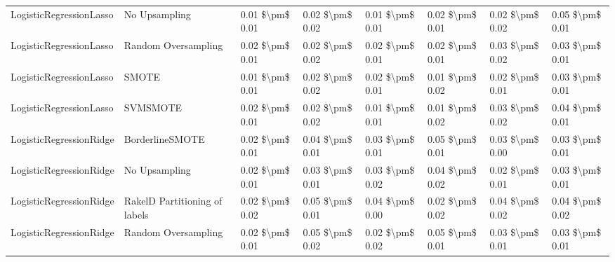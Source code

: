 \begin{tabular}{llllllll}
        LogisticRegressionLasso &                 No Upsampling & 0.01 \$\textbackslash pm\$ 0.01 &           0.02 \$\textbackslash pm\$ 0.02 &       0.01 \$\textbackslash pm\$ 0.01 &        0.02 \$\textbackslash pm\$ 0.01 &                         0.02 \$\textbackslash pm\$ 0.02 & 0.05 \$\textbackslash pm\$ 0.01 \\
        LogisticRegressionLasso &           Random Oversampling & 0.02 \$\textbackslash pm\$ 0.01 &           0.02 \$\textbackslash pm\$ 0.02 &       0.02 \$\textbackslash pm\$ 0.01 &        0.02 \$\textbackslash pm\$ 0.01 &                         0.03 \$\textbackslash pm\$ 0.02 & 0.03 \$\textbackslash pm\$ 0.01 \\
        LogisticRegressionLasso &                         SMOTE & 0.01 \$\textbackslash pm\$ 0.01 &           0.02 \$\textbackslash pm\$ 0.02 &       0.02 \$\textbackslash pm\$ 0.01 &        0.01 \$\textbackslash pm\$ 0.02 &                         0.02 \$\textbackslash pm\$ 0.01 & 0.03 \$\textbackslash pm\$ 0.01 \\
        LogisticRegressionLasso &                      SVMSMOTE & 0.02 \$\textbackslash pm\$ 0.01 &           0.02 \$\textbackslash pm\$ 0.02 &       0.01 \$\textbackslash pm\$ 0.01 &        0.01 \$\textbackslash pm\$ 0.02 &                         0.03 \$\textbackslash pm\$ 0.02 & 0.04 \$\textbackslash pm\$ 0.01 \\
        LogisticRegressionRidge &               BorderlineSMOTE & 0.02 \$\textbackslash pm\$ 0.01 &           0.04 \$\textbackslash pm\$ 0.01 &       0.03 \$\textbackslash pm\$ 0.01 &        0.05 \$\textbackslash pm\$ 0.01 &                         0.03 \$\textbackslash pm\$ 0.00 & 0.03 \$\textbackslash pm\$ 0.01 \\
        LogisticRegressionRidge &                 No Upsampling & 0.02 \$\textbackslash pm\$ 0.01 &           0.03 \$\textbackslash pm\$ 0.01 &       0.03 \$\textbackslash pm\$ 0.02 &        0.04 \$\textbackslash pm\$ 0.02 &                         0.02 \$\textbackslash pm\$ 0.01 & 0.03 \$\textbackslash pm\$ 0.01 \\
        LogisticRegressionRidge & RakelD Partitioning of labels & 0.02 \$\textbackslash pm\$ 0.02 &           0.05 \$\textbackslash pm\$ 0.01 &       0.04 \$\textbackslash pm\$ 0.00 &        0.02 \$\textbackslash pm\$ 0.02 &                         0.04 \$\textbackslash pm\$ 0.02 & 0.04 \$\textbackslash pm\$ 0.02 \\
        LogisticRegressionRidge &           Random Oversampling & 0.02 \$\textbackslash pm\$ 0.01 &           0.05 \$\textbackslash pm\$ 0.02 &       0.02 \$\textbackslash pm\$ 0.02 &        0.05 \$\textbackslash pm\$ 0.01 &                         0.03 \$\textbackslash pm\$ 0.01 & 0.03 \$\textbackslash pm\$ 0.01 \\

\end{tabular}
